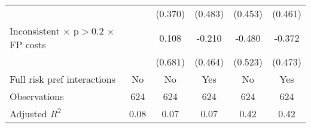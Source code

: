 \begin{tabular}{l*{5}{c}}
                &         &  (0.370)&  (0.483)&  (0.453)&  (0.461)\\
Inconsistent $\times$ p$>$0.2 $\times$ FP costs&         &    0.108&   -0.210&   -0.480&   -0.372\\
                &         &  (0.681)&  (0.464)&  (0.523)&  (0.473)\\
Full risk pref interactions&       No&       No&      Yes&       No&      Yes\\
\hline
Observations    &      624&      624&      624&      624&      624\\
Adjusted \(R^{2}\)&     0.08&     0.07&     0.07&     0.42&     0.42\\
\hline\hline
\end{tabular}

